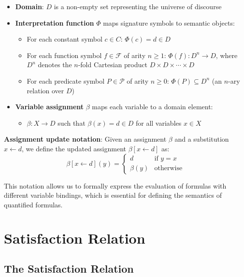 \documentclass[11pt,a4paper]{article}
\theoremstyle{definition}
\theoremstyle{plain}
\theoremstyle{remark}
\begin{document}
\begin{itemize}
    \item \textbf{Domain}: $D$ is a non-empty set representing the universe of discourse
    
    \item \textbf{Interpretation function} $\Phi$ maps signature symbols to semantic objects:
    \begin{itemize}
        \item For each constant symbol $c \in C$: $\Phi(c) = d \in D$
        \item For each function symbol $f \in \mathcal{F}$ of arity $n \geq 1$: $\Phi(f) : D^n \rightarrow D$, where $D^n$ denotes the $n$-fold Cartesian product $D \times D \times \cdots \times D$
        \item For each predicate symbol $P \in \mathcal{P}$ of arity $n \geq 0$: $\Phi(P) \subseteq D^n$ (an $n$-ary relation over $D$)
    \end{itemize}
    
    \item \textbf{Variable assignment} $\beta$ maps each variable to a domain element:
    \begin{itemize}
        \item $\beta : X \rightarrow D$ such that $\beta(x) = d \in D$ for all variables $x \in X$
    \end{itemize}
\end{itemize}

\textbf{Assignment update notation}: Given an assignment $\beta$ and a substitution $x \leftarrow d$, we define the updated assignment $\beta[x \leftarrow d]$ as:
\[
\beta[x \leftarrow d](y) = 
\begin{cases}
d & \text{if } y = x \\
\beta(y) & \text{otherwise}
\end{cases}
\]

This notation allows us to formally express the evaluation of formulas with different variable bindings, which is essential for defining the semantics of quantified formulas.






\section{Satisfaction Relation}

\subsection{The Satisfaction Relation}
\end{document}
